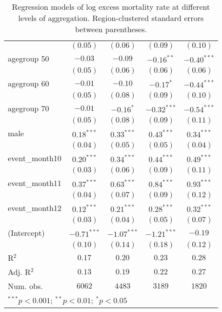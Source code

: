 \begin{table}
\begin{center}
\begin{tabular}{l c c c c}
                     & $(0.05)$      & $(0.06)$      & $(0.09)$      & $(0.10)$      \\
agegroup 50          & $-0.03$       & $-0.09$       & $-0.16^{**}$  & $-0.40^{***}$ \\
                     & $(0.05)$      & $(0.06)$      & $(0.06)$      & $(0.06)$      \\
agegroup 60          & $-0.01$       & $-0.10$       & $-0.17^{*}$   & $-0.44^{***}$ \\
                     & $(0.05)$      & $(0.08)$      & $(0.09)$      & $(0.10)$      \\
agegroup 70          & $-0.01$       & $-0.16^{*}$   & $-0.32^{***}$ & $-0.54^{***}$ \\
                     & $(0.05)$      & $(0.08)$      & $(0.09)$      & $(0.11)$      \\
male                 & $0.18^{***}$  & $0.33^{***}$  & $0.43^{***}$  & $0.34^{***}$  \\
                     & $(0.04)$      & $(0.05)$      & $(0.05)$      & $(0.04)$      \\
event\_month10       & $0.20^{***}$  & $0.34^{***}$  & $0.44^{***}$  & $0.49^{***}$  \\
                     & $(0.03)$      & $(0.06)$      & $(0.09)$      & $(0.11)$      \\
event\_month11       & $0.37^{***}$  & $0.63^{***}$  & $0.84^{***}$  & $0.93^{***}$  \\
                     & $(0.04)$      & $(0.07)$      & $(0.09)$      & $(0.12)$      \\
event\_month12       & $0.12^{***}$  & $0.21^{***}$  & $0.28^{***}$  & $0.32^{***}$  \\
                     & $(0.03)$      & $(0.04)$      & $(0.05)$      & $(0.07)$      \\
(Intercept)          & $-0.71^{***}$ & $-1.07^{***}$ & $-1.21^{***}$ & $-0.19$       \\
                     & $(0.10)$      & $(0.14)$      & $(0.18)$      & $(0.12)$      \\
\hline
R$^2$                & $0.17$        & $0.20$        & $0.23$        & $0.28$        \\
Adj. R$^2$           & $0.13$        & $0.19$        & $0.22$        & $0.27$        \\
Num. obs.            & $6062$        & $4483$        & $3189$        & $1820$        \\
\hline
\multicolumn{5}{l}{\scriptsize{$^{***}p<0.001$; $^{**}p<0.01$; $^{*}p<0.05$}}
\end{tabular}
\caption{Regression models of log excess mortality rate at different levels of aggregation. Region-clustered standard errors between parentheses.}
\label{tab:regionmodels}
\end{center}
\end{table}
